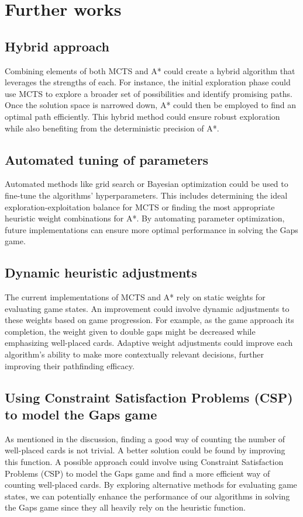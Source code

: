 \chapter{Further works}
\section{Hybrid approach}
Combining elements of both MCTS and A* could create a hybrid algorithm that leverages the strengths of each. For instance, the initial exploration phase could use MCTS to explore a broader set of possibilities and identify promising paths. Once the solution space is narrowed down, A* could then be employed to find an optimal path efficiently. This hybrid method could ensure robust exploration while also benefiting from the deterministic precision of A*.

\section{Automated tuning of parameters}
Automated methods like grid search or Bayesian optimization could be used to fine-tune the algorithms' hyperparameters. This includes determining the ideal exploration-exploitation balance for MCTS or finding the most appropriate heuristic weight combinations for A*. By automating parameter optimization, future implementations can ensure more optimal performance in solving the Gaps game.

\section{Dynamic heuristic adjustments}
The current implementations of MCTS and A* rely on static weights for evaluating game states. An improvement could involve dynamic adjustments to these weights based on game progression. For example, as the game approach its completion, the weight given to double gaps might be decreased while emphasizing well-placed cards. Adaptive weight adjustments could improve each algorithm's ability to make more contextually relevant decisions, further improving their pathfinding efficacy.

\section{Using Constraint Satisfaction Problems (CSP) to model the Gaps game}
As mentioned in the discussion, finding a good way of counting the number of well-placed cards is not trivial. A better solution could be found by improving this function. A possible approach could involve using Constraint Satisfaction Problems (CSP) to model the Gaps game and find a more efficient way of counting well-placed cards. By exploring alternative methods for evaluating game states, we can potentially enhance the performance of our algorithms in solving the Gaps game since they all heavily rely on the heuristic function.


